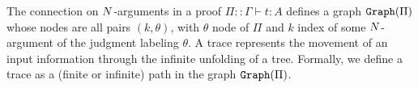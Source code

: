 %
%
%
%
%




The connection on ${N}$-arguments in a proof $\Pi::\Gamma\vdash t:A$ defines a 
graph ${\tt Graph}(\Pi)$ whose nodes are all pairs $(k,\theta)$, with $\theta$ node of $\Pi$ and 
$k$ index of some ${N}$-argument of  the judgment labeling $\theta$. 
A trace represents the movement of an input information through the 
infinite unfolding of a tree. Formally, we define a trace as a (finite or infinite) path 
in the graph ${\tt Graph}(\Pi)$.

